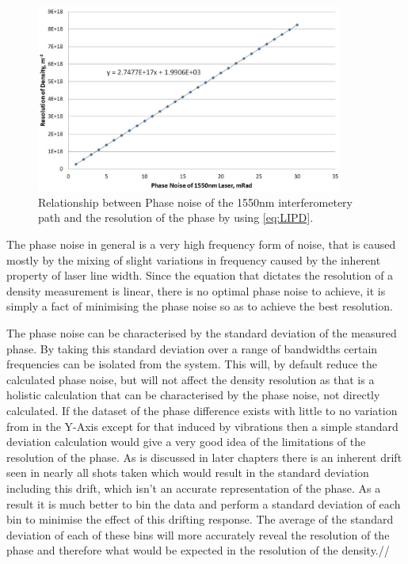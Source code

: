 \documentclass[12pt,a4paper,oneside]{report}
\begin{document}
\begin{figure}[H]
\includegraphics[width=0.9\textwidth, center,angle=0]{DImages/pn-density-relationship.JPG}
\caption{Relationship between Phase noise of the 1550nm interferometery path and the resolution of the phase by using \autoref{eq:LIPD}.}
\label{pn_density}
\end{figure}

The phase noise in general is a very high frequency form of noise, that is caused mostly by the mixing of slight variations in frequency caused by the inherent property of laser line width.
Since the equation that dictates the resolution of a density measurement is linear, there is no optimal phase noise to achieve, it is simply a fact of minimising the phase noise so as to achieve the best resolution. 

The phase noise can be characterised by the standard deviation of the measured phase. By taking this standard deviation over a range of bandwidths certain frequencies can be isolated from the system. This will, by default reduce the calculated phase noise, but will not affect the density resolution as that is a holistic calculation that can be characterised by the phase noise, not directly calculated. If the dataset of the phase difference exists with little to no variation from in the Y-Axis except for that induced by vibrations then a simple standard deviation calculation would give a very good idea of the limitations of the resolution of the phase. As is discussed in later chapters there is an inherent drift seen in nearly all shots taken which would result in the standard deviation including this drift, which isn't an accurate representation of the phase. As a result it is much better to bin the data and perform a standard deviation of each bin to minimise the effect of this drifting response. The average of the standard deviation of each of these bins will more accurately reveal the resolution of the phase and therefore what would be expected in the resolution of the density.//
\end{document}

